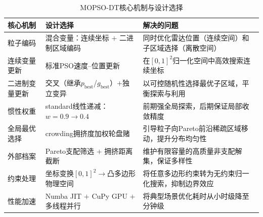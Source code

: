 \begin{table}[h]
\centering
\caption{MOPSO-DT核心机制与设计选择}
\label{tab:core_mechanisms}
\begin{tabular}{llp{6cm}}
\toprule
核心机制 & 设计选择 & 解决的问题 \\
\midrule
粒子编码 & 混合变量：连续坐标 $+$ 二进制区域编码 & 同时优化雷达位置（连续空间）和子区域选择（离散空间） \\
连续变量更新 & 标准PSO速度--位置更新 & 在$[0,1]^2$归一化空间中高效搜索连续坐标 \\
二进制变量更新 & 交叉（继承$p_{\mathrm{best}}$/$g_{\mathrm{best}}$）$+$独立变异 & 以可控随机性选择最优子区域，平衡探索与利用 \\
惯性权重 & standard线性递减：$w=0.9\to0.4$ & 前期强全局探索，后期保证局部收敛精度 \\
全局最优选择 & crowding拥挤度加权轮盘赌 & 引导粒子向Pareto前沿稀疏区域移动，提升分布均匀性 \\
外部档案 & Pareto支配筛选 $+$ 拥挤距离截断 & 维护有限容量的高质量非支配解集，保证多样性 \\
约束处理 & 坐标变换$[0,1]^2$$\to$凸多边形物理空间 & 将任意多边形约束转为无约束归一化搜索，抑制边界效应 \\
性能加速 & Numba JIT $+$ CuPy GPU $+$ 多线程并行 & 将典型场景优化耗时从小时级降至分钟级 \\
\bottomrule
\end{tabular}
\end{table}
